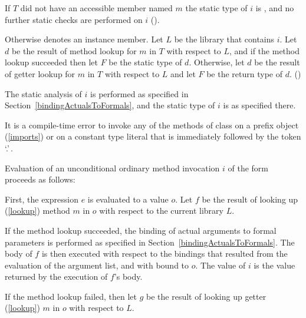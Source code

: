 \documentclass[makeidx]{article}
\begin{document}
\LMHash{}%
If $T$ did not have an accessible member named $m$ the static type of $i$ is \DYNAMIC{},
and no further static checks are performed on $i$
().

\LMHash{}%
Otherwise  denotes an instance member.
Let $L$ be the library that contains $i$.
Let $d$ be the result of method lookup for $m$ in $T$ with respect to $L$,
and if the method lookup succeeded then let $F$ be the static type of $d$.
Otherwise, let $d$ be the result of getter lookup for $m$ in $T$ with respect to $L$
and let $F$ be the return type of $d$.
()

\LMHash{}%
The static analysis of $i$ is performed as specified in Section~\ref{bindingActualsToFormals},
and the static type of $i$ is as specified there.

\LMHash{}%
It is a compile-time error to invoke any of the methods of class  on a prefix object (\ref{imports})
or on a constant type literal that is immediately followed by the token `.'\,.


\LMHash{}%
Evaluation of an unconditional ordinary method invocation $i$ of the form
proceeds as follows:

\LMHash{}%
First, the expression $e$ is evaluated to a value $o$.
Let $f$ be the result of looking up
(\ref{lookup})
method $m$ in $o$ with respect to the current library $L$.

\LMHash{}%
If the method lookup succeeded,
the binding of actual arguments to formal parameters is performed
as specified in Section~\ref{bindingActualsToFormals}.
The body of $f$ is then executed with respect to the bindings
that resulted from the evaluation of the argument list,
and with \THIS{} bound to $o$.
The value of $i$ is the value returned by the execution of $f$'s body.

\LMHash{}%
If the method lookup failed,
then let $g$ be the result of looking up getter
(\ref{lookup})
$m$ in $o$ with respect to $L$.
\end{document}
